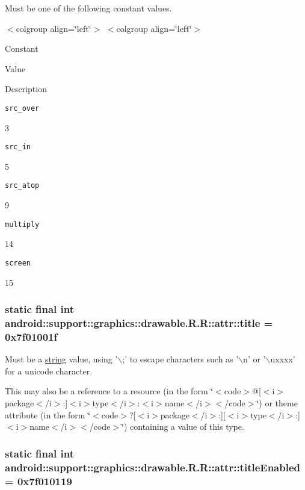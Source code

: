 Must be one of the following constant values. \begin{TabularC}{0}
\hline
\end{TabularC}
$<$colgroup align=\char`\"{}left\char`\"{}$>$ $<$colgroup align=\char`\"{}left\char`\"{}$>$ 

Constant

Value

Description 

{\tt src\_\-over}

3

{\tt src\_\-in}

5

{\tt src\_\-atop}

9

{\tt multiply}

14

{\tt screen}

15\hypertarget{classandroid_1_1support_1_1graphics_1_1drawable_1_1_r_1_1attr_897da4282a93112d61ca577322523470}{
\subsubsection[{title}]{\setlength{\rightskip}{0pt plus 5cm}static final int android::support::graphics::drawable.R.R::attr::title = 0x7f01001f}}
\label{classandroid_1_1support_1_1graphics_1_1drawable_1_1_r_1_1attr_897da4282a93112d61ca577322523470}


Must be a \hyperlink{classandroid_1_1support_1_1graphics_1_1drawable_1_1_r_1_1string}{string} value, using '$\backslash$;' to escape characters such as '$\backslash$n' or '$\backslash$uxxxx' for a unicode character. 

This may also be a reference to a resource (in the form \char`\"{}$<$code$>$@\mbox{[}$<$i$>$package$<$/i$>$:\mbox{]}$<$i$>$type$<$/i$>$:$<$i$>$name$<$/i$>$$<$/code$>$\char`\"{}) or theme attribute (in the form \char`\"{}$<$code$>$?\mbox{[}$<$i$>$package$<$/i$>$:\mbox{]}\mbox{[}$<$i$>$type$<$/i$>$:\mbox{]}$<$i$>$name$<$/i$>$$<$/code$>$\char`\"{}) containing a value of this type. \hypertarget{classandroid_1_1support_1_1graphics_1_1drawable_1_1_r_1_1attr_f5de8202959dc30d56f4e313f80076ea}{
\subsubsection[{titleEnabled}]{\setlength{\rightskip}{0pt plus 5cm}static final int android::support::graphics::drawable.R.R::attr::titleEnabled = 0x7f010119}}
\label{classandroid_1_1support_1_1graphics_1_1drawable_1_1_r_1_1attr_f5de8202959dc30d56f4e313f80076ea}


